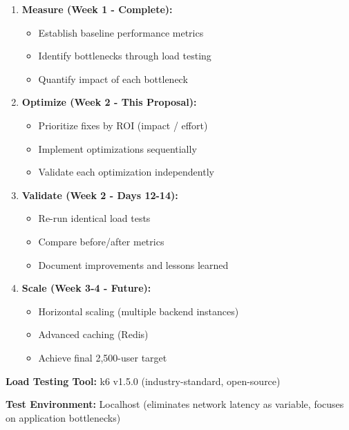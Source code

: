 \documentclass[12pt,a4paper,oneside]{report}
\begin{document}
\begin{enumerate}[leftmargin=1.5em,topsep=0.3em,itemsep=0.3em]
    \item \textbf{Measure (Week 1 - Complete):}
    \begin{itemize}[topsep=0.2em,itemsep=0.1em]
        \item Establish baseline performance metrics
        \item Identify bottlenecks through load testing
        \item Quantify impact of each bottleneck
    \end{itemize}

    \item \textbf{Optimize (Week 2 - This Proposal):}
    \begin{itemize}[topsep=0.2em,itemsep=0.1em]
        \item Prioritize fixes by ROI (impact / effort)
        \item Implement optimizations sequentially
        \item Validate each optimization independently
    \end{itemize}

    \item \textbf{Validate (Week 2 - Days 12-14):}
    \begin{itemize}[topsep=0.2em,itemsep=0.1em]
        \item Re-run identical load tests
        \item Compare before/after metrics
        \item Document improvements and lessons learned
    \end{itemize}

    \item \textbf{Scale (Week 3-4 - Future):}
    \begin{itemize}[topsep=0.2em,itemsep=0.1em]
        \item Horizontal scaling (multiple backend instances)
        \item Advanced caching (Redis)
        \item Achieve final 2,500-user target
    \end{itemize}
\end{enumerate}

\textbf{Load Testing Tool:} k6 v1.5.0 (industry-standard, open-source)

\textbf{Test Environment:} Localhost (eliminates network latency as variable, focuses on application bottlenecks)
\end{document}
